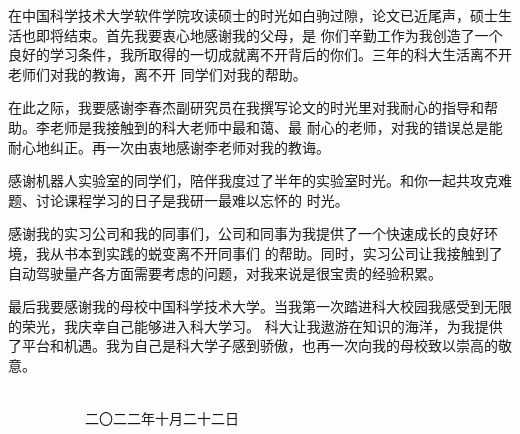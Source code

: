 
\begin{acknowledgements}
在中国科学技术大学软件学院攻读硕士的时光如白驹过隙，论文已近尾声，硕士生活也即将结束。首先我要衷心地感谢我的父母，是
你们辛勤工作为我创造了一个良好的学习条件，我所取得的一切成就离不开背后的你们。三年的科大生活离不开老师们对我的教诲，离不开
同学们对我的帮助。

在此之际，我要感谢李春杰副研究员在我撰写论文的时光里对我耐心的指导和帮助。李老师是我接触到的科大老师中最和蔼、最
耐心的老师，对我的错误总是能耐心地纠正。再一次由衷地感谢李老师对我的教诲。

感谢机器人实验室的同学们，陪伴我度过了半年的实验室时光。和你一起共攻克难题、讨论课程学习的日子是我研一最难以忘怀的
时光。

感谢我的实习公司和我的同事们，公司和同事为我提供了一个快速成长的良好环境，我从书本到实践的蜕变离不开同事们
的帮助。同时，实习公司让我接触到了自动驾驶量产各方面需要考虑的问题，对我来说是很宝贵的经验积累。

最后我要感谢我的母校中国科学技术大学。当我第一次踏进科大校园我感受到无限的荣光，我庆幸自己能够进入科大学习。
科大让我遨游在知识的海洋，为我提供了平台和机遇。我为自己是科大学子感到骄傲，也再一次向我的母校致以崇高的敬意。

~~~~~~~~~~~~~~~~~~~~~~~~~~~~~~~~~~~~~~~~~~~~~~~~~~~~~~~~~~~~~~~~~~~~~~~~~~~~~~~~~~~二〇二二年十月二十二日

\end{acknowledgements}
